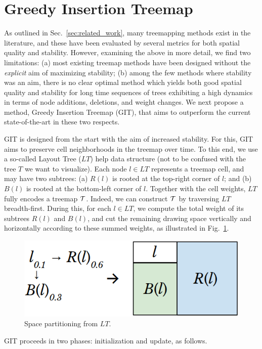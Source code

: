 \section{Greedy Insertion Treemap}
\label{sec:git}
%
As outlined in Sec.~\ref{sec:related_work}, many treemapping methods exist in the literature, and these have been evaluated by several metrics for both spatial quality and stability. However, examining the above in more detail, we find two limitations: (a) most existing treemap methods have been designed without the \emph{explicit} aim of maximizing stability; (b) among the few methods where stability was an aim, there is no clear optimal method which yields both good spatial quality and stability for long time sequences of trees exhibiting a high dynamics in terms of node additions, deletions, and weight changes. We next propose a method, Greedy Insertion Treemap (GIT), that aims to outperform the current state-of-the-art in these two respects.


GIT is designed from the start with the aim of increased stability. For this, GIT aims to preserve cell neighborhoods in the treemap over time. To this end, we use a so-called Layout Tree ($LT$) help data structure (not to be confused with the tree $T$ we want to visualize).
Each node $l \in LT$ represents a treemap cell, and may have two subtrees: (a) $R(l)$ is rooted at the top-right corner of $l$; and (b) $B(l)$ is rooted at the bottom-left corner of $l$. Together with the cell weights, $LT$ fully encodes a treemap ${\cal T}$. Indeed, we can construct ${\cal T}$ by traversing $LT$ breadth-first.
During this, for each $l \in LT$, we compute the total weight of its subtrees $R(l)$ and $B(l)$, and cut the remaining drawing space vertically and horizontally according to these summed weights, as illustrated in Fig.~\ref{fig:space-partition}.

\begin{figure}
\centering
\includegraphics[width=.63\textwidth]{figures/treemap-algorithm/space-partition.png}
\caption{Space partitioning from $LT$.}
\label{fig:space-partition}
\end{figure}

GIT proceeds in two phases: initialization and update, as follows.\\

